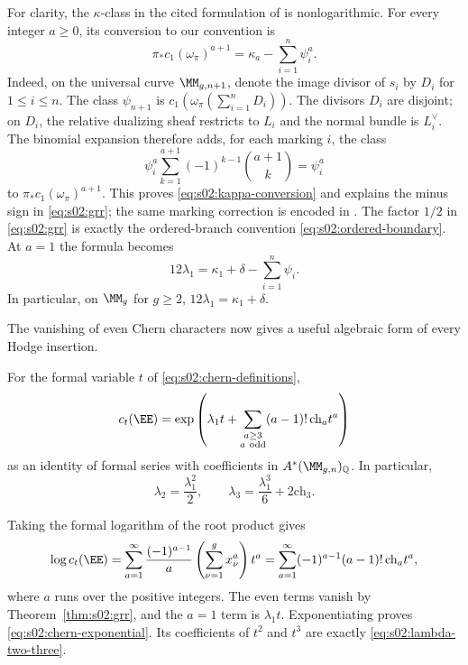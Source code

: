 For clarity, the $\kappa$-class in the cited formulation of
\cite{FP00} is nonlogarithmic.  For every integer $a\geq0$, its
conversion to our convention is
\begin{equation}
\label{eq:s02:kappa-conversion}
\pi_*c_1(\omega_\pi)^{a+1}
=\kappa_a-\sum_{i=1}^n\psi_i^a.
\end{equation}
Indeed, on the universal curve $\MM_{g,n+1}$, denote the image
divisor of $s_i$ by $D_i$ for $1\leq i\leq n$.
The class $\psi_{n+1}$ is
$c_1(\omega_\pi(\sum_{i=1}^nD_i))$.  The divisors $D_i$ are
disjoint; on $D_i$, the relative dualizing sheaf restricts to $L_i$
and the normal bundle is $L_i^\vee$.  The binomial expansion therefore
adds, for each marking $i$, the class
\[
\psi_i^a\sum_{k=1}^{a+1}(-1)^{k-1}\binom{a+1}{k}
=\psi_i^a
\]
to $\pi_*c_1(\omega_\pi)^{a+1}$.  This proves
\eqref{eq:s02:kappa-conversion} and explains the minus sign in
\eqref{eq:s02:grr}; the same marking correction is encoded in
\cite[\S 1.3, (16)]{FP00}.  The factor $1/2$ in
\eqref{eq:s02:grr} is exactly the ordered-branch convention
\eqref{eq:s02:ordered-boundary}.  At $a=1$ the formula becomes
\begin{equation}
\label{eq:s02:lambda-one-grr}
12\lambda_1=\kappa_1+\delta-\sum_{i=1}^n\psi_i.
\end{equation}
In particular, on $\MM_g$ for $g\geq2$,
$12\lambda_1=\kappa_1+\delta$.

The vanishing of even Chern characters now gives a useful algebraic
form of every Hodge insertion.

\begin{lmm}
\label{lmm:s02:chern-exponential}
For the formal variable $t$ of \eqref{eq:s02:chern-definitions},
\begin{equation}
\label{eq:s02:chern-exponential}
c_t(\EE)=\exp\left(
\lambda_1t+
\sum_{\substack{a\geq3\\a\ \mathrm{odd}}}
(a-1)!\,\mathrm{ch}_a t^a\right)
\end{equation}
as an identity of formal series with coefficients in
$A^*(\MM_{g,n})_{\mathbb Q}$.  In particular,
\begin{equation}
\label{eq:s02:lambda-two-three}
\lambda_2=\frac{\lambda_1^2}{2},
\qquad
\lambda_3=\frac{\lambda_1^3}{6}+2\mathrm{ch}_3.
\end{equation}
\end{lmm}

\begin{prf}
Taking the formal logarithm of the root product gives
\[
\log c_t(\EE)
=\sum_{a=1}^{\infty}\frac{(-1)^{a-1}}{a}
\left(\sum_{\nu=1}^g x_\nu^a\right)t^a
=\sum_{a=1}^{\infty}(-1)^{a-1}(a-1)!\,
\mathrm{ch}_a t^a,
\]
where $a$ runs over the positive integers.  The even terms vanish by
Theorem~\ref{thm:s02:grr}, and the $a=1$ term is $\lambda_1t$.
Exponentiating proves \eqref{eq:s02:chern-exponential}.  Its
coefficients of $t^2$ and $t^3$ are exactly
\eqref{eq:s02:lambda-two-three}.
\end{prf}
